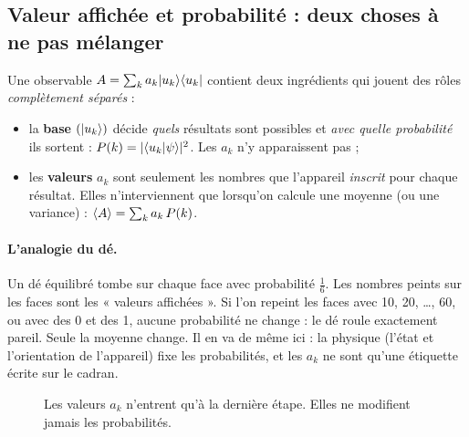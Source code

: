 \subsection*{Valeur affichée et probabilité : deux choses à ne pas mélanger}
Une observable $A=\sum_ka_k\lvert u_k\rangle\langle u_k\rvert$ contient deux ingrédients qui jouent des rôles \emph{complètement séparés} :
\begin{itemize}
\item la \textbf{base} $(\lvert u_k\rangle)$ décide \emph{quels} résultats sont possibles et \emph{avec quelle probabilité} ils sortent : $P(k)=|\langle u_k\vert \psi\rangle|^2$. Les $a_k$ n'y apparaissent pas ;
\item les \textbf{valeurs} $a_k$ sont seulement les nombres que l'appareil \emph{inscrit} pour chaque résultat. Elles n'interviennent que lorsqu'on calcule une moyenne (ou une variance) : $\langle A\rangle=\sum_ka_k\,P(k)$.
\end{itemize}

\paragraph{L'analogie du dé.} Un dé équilibré tombe sur chaque face avec probabilité $\tfrac16$. Les nombres peints sur les faces sont les « valeurs affichées ». Si l'on repeint les faces avec 10, 20, \dots, 60, ou avec des 0 et des 1, aucune probabilité ne change : le dé roule exactement pareil. Seule la moyenne change. Il en va de même ici : la physique (l'état et l'orientation de l'appareil) fixe les probabilités, et les $a_k$ ne sont qu'une étiquette écrite sur le cadran.

\begin{figure}[htbp]
\centering
{}
\caption{Les valeurs $a_k$ n'entrent qu'à la dernière étape. Elles ne modifient jamais les probabilités.}\label{fig:chaine-mesure}
\end{figure}

